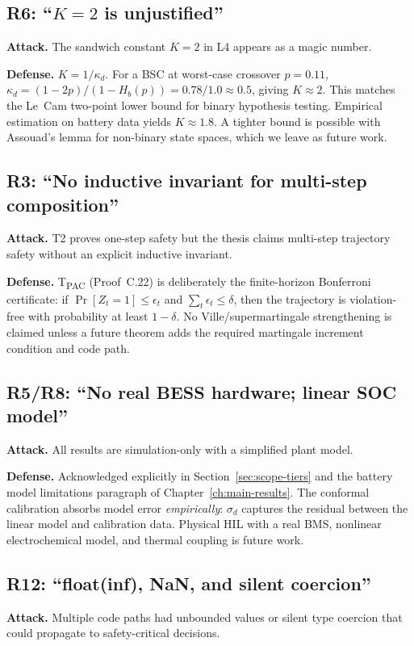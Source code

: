 \subsection{R6: ``$K=2$ is unjustified''}
\textbf{Attack.}  The sandwich constant $K=2$ in L4 appears as a magic
number.

\textbf{Defense.}  $K = 1/\kappa_d$.  For a BSC at worst-case crossover
$p=0.11$, $\kappa_d = (1-2p)/(1-H_b(p)) = 0.78/1.0 \approx 0.5$, giving
$K \approx 2$.  This matches the Le~Cam two-point lower bound for binary
hypothesis testing.  Empirical estimation on battery data yields
$K \approx 1.8$.  A tighter bound is possible with Assouad's lemma for
non-binary state spaces, which we leave as future work.

\subsection{R3: ``No inductive invariant for multi-step composition''}
\textbf{Attack.}  T2 proves one-step safety but the thesis claims
multi-step trajectory safety without an explicit inductive invariant.

\textbf{Defense.}  T\textsubscript{PAC} (Proof~C.22) is deliberately the
finite-horizon Bonferroni certificate: if
\(\Pr[Z_t=1]\le\epsilon_t\) and \(\sum_t\epsilon_t\le\delta\), then the
trajectory is violation-free with probability at least \(1-\delta\).  No
Ville/supermartingale strengthening is claimed unless a future theorem adds
the required martingale increment condition and code path.

\subsection{R5/R8: ``No real BESS hardware; linear SOC model''}
\textbf{Attack.}  All results are simulation-only with a simplified
plant model.

\textbf{Defense.}  Acknowledged explicitly in Section~\ref{sec:scope-tiers}
and the battery model limitations paragraph of
Chapter~\ref{ch:main-results}.  The conformal calibration absorbs model
error \emph{empirically}: $\sigma_d$ captures the residual between the
linear model and calibration data.  Physical HIL with a real BMS,
nonlinear electrochemical model, and thermal coupling is future work.

\subsection{R12: ``float(inf), NaN, and silent coercion''}
\textbf{Attack.}  Multiple code paths had unbounded values or silent
type coercion that could propagate to safety-critical decisions.

